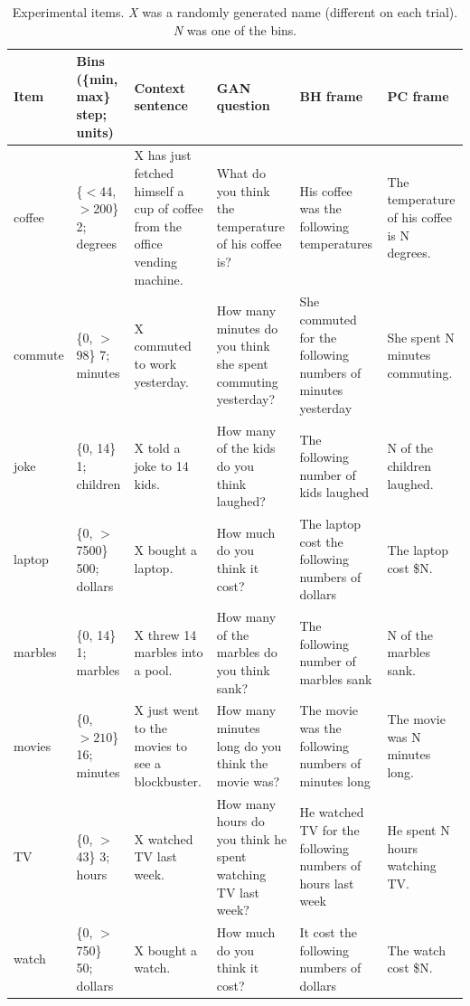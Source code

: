 \documentclass[10pt,letterpaper]{article}
\begin{document}
\begin{table}
  \footnotesize
  \centering
  \begin{tabular}{l p{2.2cm} p{2.5cm} p{3.5cm} p{3cm} p{2.5cm}}
	\toprule
	\textbf{Item} & \textbf{Bins} (\{min, max\} step; units)& \textbf{Context sentence} & \textbf{GAN question} & \textbf{BH frame} & \textbf{PC frame} \\
	\midrule
    coffee &  \{$<$44, $>$200\} 2; degrees  & X has just fetched himself a cup of coffee from the office vending machine. & What do you think the temperature of his coffee is?  & His coffee was the following temperatures & The temperature of his coffee is N degrees.\\
    	\midrule
	commute &  \{0, $>$98\} 7; minutes & X commuted to work yesterday. & How many minutes do you think she spent commuting yesterday? & She commuted for the following numbers of minutes yesterday & She spent N minutes commuting.\\
		\midrule
	joke &  \{0, 14\} 1; children  & X told a joke to 14 kids. & How many of the kids do you think laughed? & The following number of kids laughed & N of the children laughed.\\
    	\midrule
	laptop &  \{0, $>$7500\} 500; dollars& X bought a laptop. & How much do you think it cost? & The laptop cost the following numbers of dollars & The laptop cost \$N.\\
	\midrule
    marbles &  \{0, 14\} 1; marbles & X threw 14 marbles into a pool. & How many of the marbles do you think sank? & The following number of marbles sank & N of the marbles sank.\\
	\midrule
	movies &  \{0, $>210$\} 16; minutes& X just went to the movies to see a blockbuster. & How many minutes long do you think the movie was? & The movie was the following numbers of minutes long & The movie was N minutes long.\\
	\midrule
	TV &  \{0, $>$43\} 3; hours & X watched TV last week. & How many hours do you think he spent watching TV last week? & He watched TV for the following numbers of hours last week & He spent N hours watching TV.\\
	\midrule
	watch &  \{0, $>$750\} 50; dollars& X bought a watch.& How much do you think it cost? & It cost the following numbers of dollars & The watch cost \$N.\\
    \bottomrule
  \end{tabular}
  \caption{Experimental items. \emph{X} was a randomly generated name (different on each trial). \emph{N} was one of the bins.}
  \label{tab:Items}
\end{table}
\end{document}
